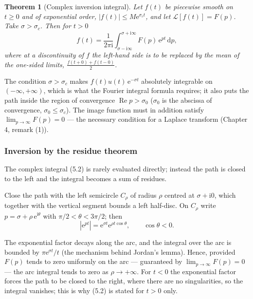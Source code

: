 \documentclass[11pt,a4paper]{article}
\theoremstyle{definition}
\theoremstyle{plain}
\newtheorem{theorem}{Theorem}[section]
\begin{document}
\begin{theorem}[Complex inversion integral]
Let $f(t)$ be piecewise smooth on $t\ge 0$ and of exponential order,
$\left|f(t)\right|\le M\mathrm{e}^{\sigma_c t}$, and let
$\mathcal{L}\left[f(t)\right]=F(p)$. Take $\sigma>\sigma_c$. Then for $t>0$
\begin{equation}
f(t)=\frac{1}{2\pi\mathrm{i}}\int_{\sigma-\mathrm{i}\infty}^{\sigma+\mathrm{i}\infty}
F(p)\,\mathrm{e}^{pt}\,\mathrm{d}p , \tag{5.2}
\end{equation}
where at a discontinuity of $f$ the left-hand side is to be replaced by the mean of the one-sided
limits, $\frac{f(t+0)+f(t-0)}{2}$.
\end{theorem}

The condition $\sigma>\sigma_c$ makes $f(t)u(t)\,\mathrm{e}^{-\sigma t}$ absolutely integrable on
$(-\infty,+\infty)$, which is what the Fourier integral formula requires; it also puts the path
inside the region of convergence $\operatorname{Re}p>\sigma_0$ ($\sigma_0$ is the abscissa of
convergence, $\sigma_0\le\sigma_c$). The image function must in addition satisfy
$\lim_{p\to\infty}F(p)=0$ --- the necessary condition for a Laplace transform (Chapter 4,
remark (1)).

\subsubsection{Inversion by the residue theorem}

The complex integral (5.2) is rarely evaluated directly; instead the path is closed to the left and
the integral becomes a sum of residues.

Close the path with the left semicircle $C_{\rho}$ of radius $\rho$ centred at
$\sigma+\mathrm{i}0$, which together with the vertical segment bounds a left half-disc. On
$C_{\rho}$ write $p=\sigma+\rho\,\mathrm{e}^{\mathrm{i}\theta}$ with
$\pi/2<\theta<3\pi/2$; then
\begin{equation*}
\left|\mathrm{e}^{pt}\right|=\mathrm{e}^{\sigma t}\mathrm{e}^{\rho t\cos\theta},
\qquad \cos\theta<0 .
\end{equation*}

The exponential factor decays along the arc, and the integral over the arc is bounded by
$\pi\mathrm{e}^{\sigma t}/t$ (the mechanism behind Jordan's lemma). Hence, provided
$F(p)$ tends to zero uniformly on the arc --- guaranteed by $\lim_{p\to\infty}F(p)=0$ --- the arc
integral tends to zero as $\rho\to+\infty$. For $t<0$ the exponential factor forces the path to be
closed to the right, where there are no singularities, so the integral vanishes; this is why (5.2)
is stated for $t>0$ only.
\end{document}

